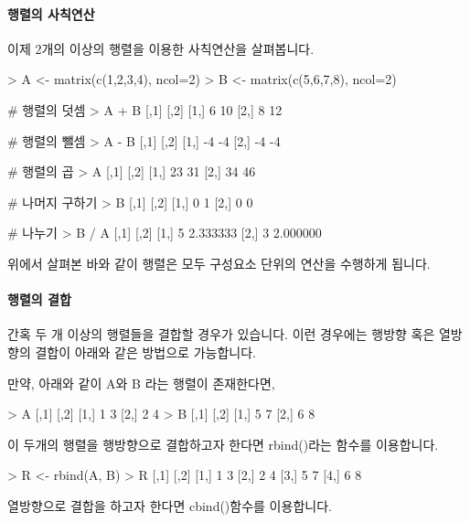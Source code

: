 \paragraph{행렬의 사칙연산} 이제 2개의 이상의 행렬을 이용한 사칙연산을 살펴봅니다.

\begin{Schunk}
\begin{Soutput}
> A <- matrix(c(1,2,3,4), ncol=2)
> B <- matrix(c(5,6,7,8), ncol=2)

# 행렬의 덧셈
> A + B 
     [,1] [,2]
[1,]    6   10
[2,]    8   12

# 행렬의 뺄셈
> A - B
     [,1] [,2]
[1,]   -4   -4
[2,]   -4   -4

# 행렬의 곱 
> A %*% B 
     [,1] [,2]
[1,]   23   31
[2,]   34   46

# 나머지 구하기
> B %% A
     [,1] [,2]
[1,]    0    1
[2,]    0    0

# 나누기 
> B / A
     [,1]     [,2]
[1,]    5 2.333333
[2,]    3 2.000000
 
\end{Soutput}
\end{Schunk}

위에서 살펴본 바와 같이 행렬은 모두 구성요소 단위의 연산을 수행하게 됩니다. 

\paragraph{행렬의 결합}  간혹 두 개 이상의 행렬들을 결합할 경우가 있습니다.
이런 경우에는 행방향 혹은 열방향의 결합이 아래와 같은 방법으로 가능합니다.

만약, 아래와 같이 A와 B 라는 행렬이 존재한다면, 

\begin{Schunk}
\begin{Soutput}
> A
     [,1] [,2]
[1,]    1    3
[2,]    2    4
> B
     [,1] [,2]
[1,]    5    7
[2,]    6    8
\end{Soutput}
\end{Schunk}

이 두개의 행렬을 행방향으로 결합하고자 한다면 rbind()라는 함수를 이용합니다.

\begin{Schunk}
\begin{Soutput}
> R <- rbind(A, B)
> R
     [,1] [,2]
[1,]    1    3
[2,]    2    4
[3,]    5    7
[4,]    6    8
\end{Soutput}
\end{Schunk}

열방향으로 결합을 하고자 한다면 cbind()함수를 이용합니다. 

